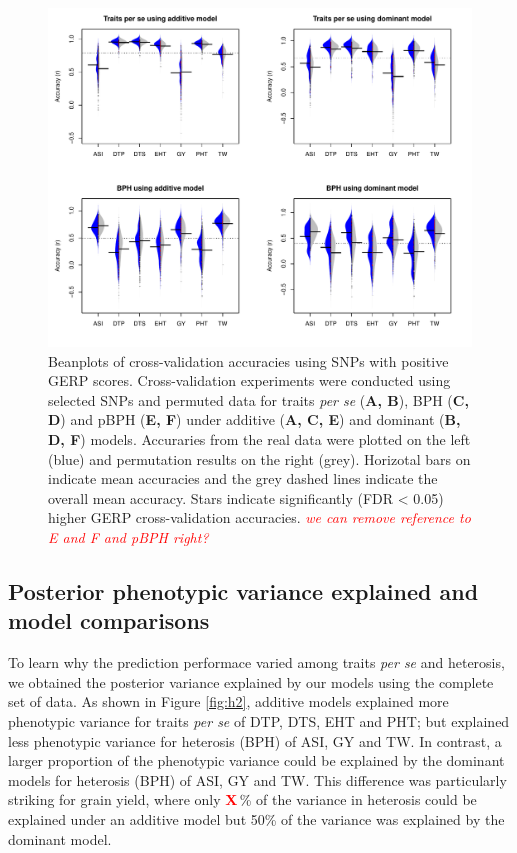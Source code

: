 \documentclass[9pt,twocolumn,twoside]{gsajnl}
\newcommand{\X}{\textcolor{red}{\bf X\,}}
\newcommand{\jri}[1]{\textcolor{red}{ \emph{ #1}} }
\begin{document}
\begin{figure}[htbp]
\centering
\includegraphics[width=\linewidth]{Figure_gerpall.pdf}
\caption{Beanplots of cross-validation accuracies using SNPs with positive GERP scores. Cross-validation experiments were conducted using selected SNPs and permuted data for traits \emph{per se} (\textbf{A, B}), BPH (\textbf{C, D}) and pBPH (\textbf{E, F}) under additive (\textbf{A, C, E}) and dominant (\textbf{B, D, F}) models. Accuraries from the real data were plotted on the left (blue) and permutation results on the right (grey). Horizotal bars on indicate mean accuracies and the grey dashed lines indicate the overall mean accuracy. Stars indicate significantly (FDR < 0.05) higher GERP cross-validation accuracies. \jri{we can remove reference to E and F and pBPH right?}}
\label{fig:gerpall}
\end{figure}

\subsection*{Posterior phenotypic variance explained and model comparisons}

To learn why the prediction performace varied among traits \emph{per se} and heterosis, we obtained the posterior variance explained by our models using the complete set of data. 
As shown in Figure \ref{fig:h2}, additive models explained more phenotypic variance for traits \emph{per se} of DTP, DTS, EHT and PHT; but explained less phenotypic variance for heterosis (BPH) of ASI, GY and TW. 
In contrast, a larger proportion of the phenotypic variance could be explained by the dominant models for heterosis (BPH) of ASI, GY and TW. 
This difference was particularly striking for grain yield, where only \X \% of the variance in heterosis could be explained under an additive model but 50\% of the variance was explained by the dominant model. 
\end{document}
